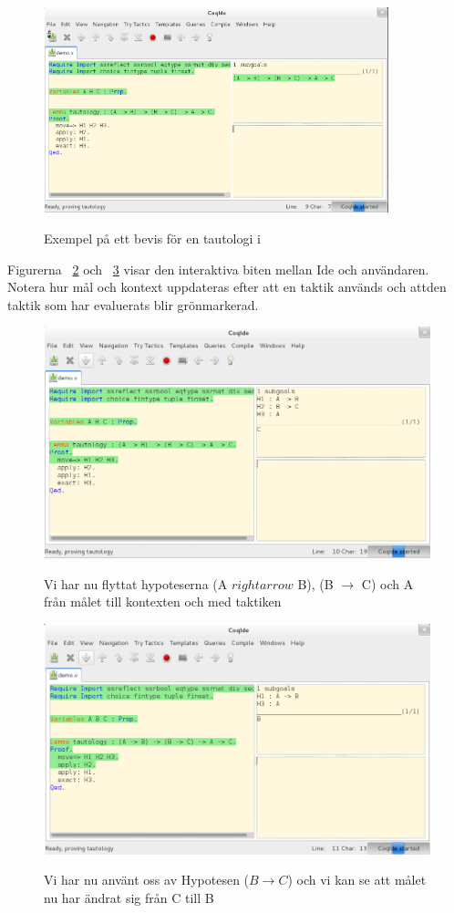 \begin{figure}[H]
  \centering
  \includegraphics[width=100mm]{images/Proof_part1}
  \label{fig:bevis1}
  \caption[Exempel på bevis i \coq{}]
   {Exempel på ett bevis för en tautologi i \coq{}}
\end{figure}

Figurerna ~\ref{fig:bevis2} och ~\ref{fig:bevis3} visar den interaktiva
biten mellan \coq Ide och användaren. Notera hur mål och kontext uppdateras
efter att en taktik används och attden taktik som har evaluerats blir grönmarkerad.


\begin{figure}[H]
  \centering
  \includegraphics[width=150mm]{images/Proof_part2}
  \label{fig:bevis2}
  \caption[Bevis i \coq{} Ide]
   {Vi har nu flyttat hypoteserna (A $rightarrow$ B), (B $\rightarrow$ C) och A
    från målet till kontexten och med taktiken }
\end{figure}

\begin{figure}[H]
  \centering
  \includegraphics[width=150mm]{images/Proof_part3}
  \label{fig:bevis3}
  \caption[Bevis i \coq{} Ide]
   {Vi har nu använt oss av Hypotesen ($B \rightarrow C$) och vi
    kan se att målet nu har ändrat sig från C till B}
\end{figure}
